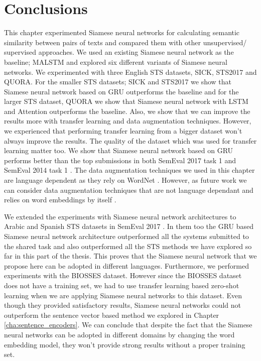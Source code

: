 \section{Conclusions}
\label{sec:siamese_conclusions}
This chapter experimented Siamese neural networks for calculating semantic similarity between pairs of texts and compared them with other unsupervised/ supervised approaches. We used an existing Siamese neural network as the baseline; MALSTM \cite{Mueller_Thyagarajan_2016} and explored six different variants of Siamese neural networks. We experimented with three English STS datasets, SICK, STS2017 and QUORA. For the smaller STS datasets; SICK and STS2017 we show that Siamese neural network based on GRU outperforms the baseline and for the larger STS dataset, QUORA we show that Siamese neural network with LSTM and Attention outperforms the baseline. Also, we show that we can improve the results more with transfer learning and data augmentation techniques. However, we experienced that performing transfer learning from a bigger dataset won't always improve the results. The quality of the dataset which was used for transfer learning matter too. We show that Siamese neural network based on GRU performs better than the top submissions in both SemEval 2017 task 1 \cite{cer-etal-2017-semeval} and  SemEval 2014 task 1 \cite{marelli-etal-2014-semeval}. The data augmentation techniques we used in this chapter are language dependent as they rely on WordNet \cite{10.1145/219717.219748}. However, as future work we can consider data augmentation techniques that are not language dependant and relies on word embeddings by itself \cite{kumar-etal-2020-data}. 

We extended the experiments with Siamese neural network architectures to Arabic and Spanish STS datasets in SemEval 2017 \cite{cer-etal-2017-semeval}. In them too the GRU based Siamese neural network architecture outperformed all the systems submitted to the shared task and also outperformed all the STS methods we have explored so far in this part of the thesis. This proves that the Siamese neural network that we propose here can be adopted in different languages. Furthermore, we performed experiments with the BIOSSES dataset. However since the BIOSSES dataset does not have a training set, we had to use transfer learning based zero-shot learning when we are applying Siamese neural networks to this dataset. Even though they provided satisfactory results, Siamese neural networks could not outperform the sentence vector based method we explored in Chapter \ref{cha:sentence_encoders}. We can conclude that despite the fact that the Siamese neural networks can be adopted in different domains by changing the word embedding model, they won't provide strong results without a proper training set. 


